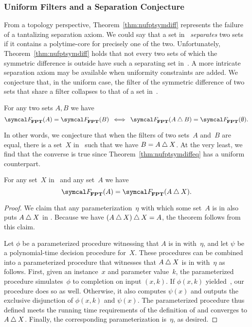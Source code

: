 \subsubsection{Uniform Filters and a Separation Conjecture}
From a topology perspective, Theorem~\ref{thm:nufptsymdiff} represents the failure of a tantalizing separation axiom.
We could say that a set in~ \emph{separates} two sets if it contains a polytime-core for precisely one of the two.
Unfortunately, Theorem~\ref{thm:nufptsymdiff} holds that not every two sets of which the symmetric difference is outside  have such a separating set in~.
A more intricate separation axiom may be available when uniformity constraints are added.
We conjecture that, in the uniform case, the filter of the symmetric difference of two sets that share a filter collapses to that of a set in~.
\begin{conjecture}
\label{con:fptsymdiff}%
  For any two sets $A, B$ we have
  \begin{equation*}
    \calF_\cl{FPT}(A) = \calF_\cl{FPT}(B) \:\iff\: \calF_\cl{FPT}(A \symdiff B) = \calF_\cl{FPT}(\emptyset).
  \end{equation*}
\end{conjecture}

In other words, we conjecture that when the filters of two sets~$A$ and~$B$ are equal, there is a set~$X$ in~ such that we have $B = A \bigtriangleup X$.
At the very least, we find that the converse is true since Theorem~\ref{thm:nufptsymdiffeq} has a uniform counterpart.
\begin{theorem}
  For any set~$X$ in~ and any set~$A$ we have
  \begin{equation*}
    \calF_\cl{FPT}(A) = \calF_\cl{FPT}(A \symdiff X).
  \end{equation*}
\end{theorem}
\begin{proof}
  We claim that any parameterization~$\eta$ with which some set~$A$ is in  also puts $A \bigtriangleup X$ in .
  Because we have $(A \bigtriangleup X) \bigtriangleup X = A$, the theorem follows from this claim.

  Let $\phi$ be a parameterized procedure witnessing that $A$ is in  with~$\eta$, and let $\psi$ be a polynomial-time decision procedure for~$X$.
  These procedures can be combined into a parameterized procedure that witnesses that $A \bigtriangleup X$ is in  with~$\eta$ as follows.
  First, given an instance~$x$ and parameter value~$k$, the parameterized procedure simulates~$\phi$ to completion on input $(x, k)$.
  If $\phi(x, k)$ yielded~, our procedure does so as well.
  Otherwise, it also computes $\psi(x)$ and outputs the exclusive disjunction of $\phi(x, k)$ and $\psi(x)$.
  The parameterized procedure thus defined meets the running time requirements of the definition of  and converges to $A \bigtriangleup X$.
  Finally, the corresponding parameterization is~$\eta$, as desired.
\end{proof}

